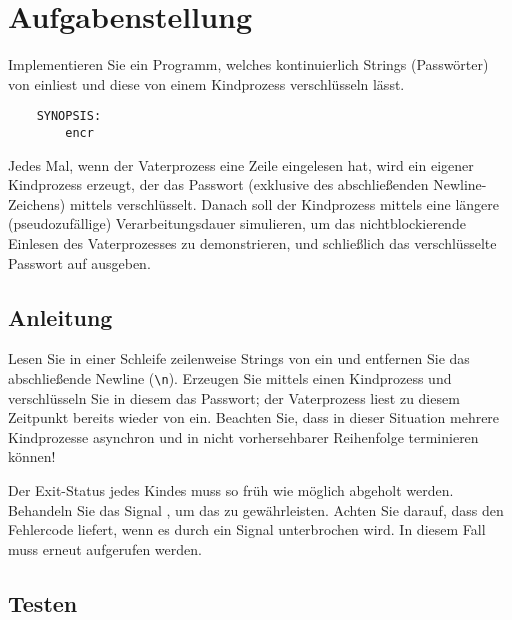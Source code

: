 




\section*{Aufgabenstellung}

Implementieren Sie ein Programm, welches kontinuierlich Strings
(Passwörter) von  einliest und diese von einem Kindprozess
verschlüsseln lässt.

\begin{verbatim}
    SYNOPSIS:
        encr
\end{verbatim}

Jedes Mal, wenn der Vaterprozess eine Zeile eingelesen hat, wird ein
eigener Kindprozess erzeugt, der das Passwort (exklusive des
abschließenden Newline-Zeichens) mittels 
verschlüsselt. Danach soll der Kindprozess mittels 
eine längere (pseudozufällige) Verarbeitungsdauer simulieren, um das
nichtblockierende Einlesen des Vaterprozesses zu demonstrieren, und
schließlich das verschlüsselte Passwort auf  ausgeben.

\subsection*{Anleitung}

Lesen Sie in einer Schleife zeilenweise Strings von  ein
und entfernen Sie das abschließende Newline (\verb+\n+). Erzeugen Sie
mittels  einen Kindprozess und verschlüsseln Sie in
diesem das Passwort; der Vaterprozess liest zu diesem Zeitpunkt
bereits wieder von  ein. Beachten Sie, dass in dieser
Situation mehrere Kindprozesse asynchron und in nicht vorhersehbarer
Reihenfolge terminieren können!

Der Exit-Status jedes Kindes muss so früh wie möglich abgeholt werden.
Behandeln Sie das Signal , um das zu gewährleisten.
Achten Sie darauf, dass  den Fehlercode 
liefert, wenn es durch ein Signal unterbrochen wird. In diesem Fall
muss  erneut aufgerufen werden.

\subsection*{Testen}

